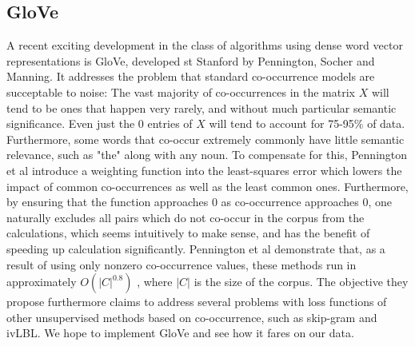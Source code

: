 \documentclass[conference]{IEEEtran}
\begin{document}
\subsection{GloVe}  A recent exciting development in the class of algorithms using dense word vector representations is GloVe, developed st Stanford by Pennington, Socher and Manning. It addresses the problem that standard co-occurrence models are succeptable to noise: The vast majority of co-occurrences in the matrix $X$ will tend to be ones that happen very rarely, and without much particular semantic significance. Even just the 0 entries of $X$ will tend to account for 75-95\% of data. Furthermore, some words that co-occur extremely commonly have little semantic relevance, such as "the" along with any noun. To compensate for this, Pennington et al introduce a weighting function into the least-squares error which lowers the impact of common co-occurrences as well as the least common ones. Furthermore, by ensuring that the function approaches 0 as co-occurrence approaches 0, one naturally excludes all pairs which do not co-occur in the corpus from the calculations, which seems intuitively to make sense, and has the benefit of speeding up calculation significantly. Pennington et al demonstrate that, as a result of using only nonzero co-occurrence values, these methods run in approximately $O(|C|^{0.8})$ , where $|C|$ is the size of the corpus. The objective they propose furthermore claims to address several problems with loss functions of other unsupervised methods based on co-occurrence, such as skip-gram and ivLBL.  We hope to implement GloVe and see how it fares on our data. \cite{GloVe}





\end{document}
